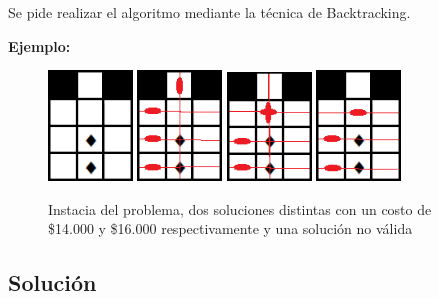 \documentclass[a4paper, 10pt, twoside]{article}
\begin{document}
Se pide realizar el algoritmo mediante la técnica de Backtracking.

\textbf{Ejemplo:}
\begin{figure}[H]
  \centering
\includegraphics[width=0.20\textwidth]{ejemplo_problema3/grilla.png}
\includegraphics[width=0.20\textwidth]{ejemplo_problema3/grilla-sol16000.png}
\includegraphics[width=0.20\textwidth]{ejemplo_problema3/grilla-sol14000.png}
\includegraphics[width=0.20\textwidth]{ejemplo_problema3/grillaSinSol.png}
  \caption{Instacia del problema, dos soluciones distintas con un costo de \$14.000 y \$16.000 respectivamente y una solución no válida} 
  \label{fig:1}
\end{figure}


\subsection{Solución}

\newcommand{\Libre}{\texttt{Libre}}
\newcommand{\Sensado}{\texttt{Sensado}}
\newcommand{\Importante}{\texttt{Importante}}
\newcommand{\Pared}{\texttt{Pared}}
\newcommand{\SensorV}{\texttt{SensorVertical}}
\newcommand{\SensorH}{\texttt{SensorHorizontal}}
\newcommand{\SensorC}{\texttt{SensorCuadruple}}
\end{document}
